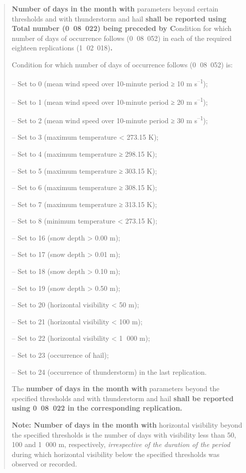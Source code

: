 \begin{quote}
\textbf{Number of days in the month with} parameters beyond certain thresholds and with thunderstorm and hail \textbf{shall be reported using Total number (0~08~022) being preceded by C}ondition for which number of days of occurrence follows (0\textbf{~}08~052) in each of the required eighteen replications (1\textbf{~}02~018)\textbf{.}

Condition for which number of days of occurrence follows (0\textbf{~}08~052) is:

-- Set to 0 (mean wind speed over 10-minute period ≥ 10 m s\textsuperscript{--1});

-- Set to 1 (mean wind speed over 10-minute period ≥ 20 m s\textsuperscript{--1});

-- Set to 2 (mean wind speed over 10-minute period ≥ 30 m s\textsuperscript{--1});

-- Set to 3 (maximum temperature \textless{} 273.15 K);

-- Set to 4 (maximum temperature ≥ 298.15 K);

-- Set to 5 (maximum temperature ≥ 303.15 K);

-- Set to 6 (maximum temperature ≥ 308.15 K);

-- Set to 7 (maximum temperature ≥ 313.15 K);

-- Set to 8 (minimum temperature \textless{} 273.15 K);

-- Set to 16 (snow depth \textgreater{} 0.00 m);

-- Set to 17 (snow depth \textgreater{} 0.01 m);

-- Set to 18 (snow depth \textgreater{} 0.10 m);

-- Set to 19 (snow depth \textgreater{} 0.50 m);

-- Set to 20 (horizontal visibility \textless{} 50 m);

-- Set to 21 (horizontal visibility \textless{} 100 m);

-- Set to 22 (horizontal visibility \textless{} 1\textbf{~}000 m);

-- Set to 23 (occurrence of hail);

-- Set to 24 (occurrence of thunderstorm) in the last replication.

The \textbf{number of days in the month with} parameters beyond the specified thresholds and with thunderstorm and hail \textbf{shall be reported using 0~08~022 in the corresponding replication.}

\textbf{Note: Number of days in the month with} horizontal visibility beyond the specified thresholds is the number of days with visibility less than 50, 100 and 1\textbf{~}000 m, respectively, \emph{irrespective of the duration of the period} during which horizontal visibility below the specified thresholds was observed or recorded.
\end{quote}


